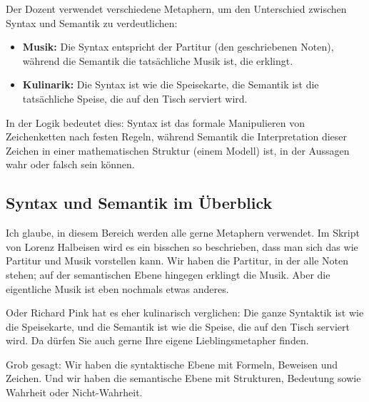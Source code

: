 \begin{didactic-insight}
Der Dozent verwendet verschiedene Metaphern, um den Unterschied zwischen Syntax und Semantik zu verdeutlichen:
\begin{itemize}
    \item \textbf{Musik:} Die Syntax entspricht der Partitur (den geschriebenen Noten), während die Semantik die tatsächliche Musik ist, die erklingt.
    \item \textbf{Kulinarik:} Die Syntax ist wie die Speisekarte, die Semantik ist die tatsächliche Speise, die auf den Tisch serviert wird.
\end{itemize}
In der Logik bedeutet dies: Syntax ist das formale Manipulieren von Zeichenketten nach festen Regeln, während Semantik die Interpretation dieser Zeichen in einer mathematischen Struktur (einem Modell) ist, in der Aussagen wahr oder falsch sein können.
\end{didactic-insight}

\subsection{Syntax und Semantik im Überblick}

\begin{spoken-clean}[00:35:40 - 00:37:30]
Ich glaube, in diesem Bereich werden alle gerne Metaphern verwendet. Im Skript von Lorenz Halbeisen wird es ein bisschen so beschrieben, dass man sich das wie Partitur und Musik vorstellen kann. Wir haben die Partitur, in der alle Noten stehen; auf der semantischen Ebene hingegen erklingt die Musik. Aber die eigentliche Musik ist eben nochmals etwas anderes.

Oder Richard Pink hat es eher kulinarisch verglichen: Die ganze Syntaktik ist wie die Speisekarte, und die Semantik ist wie die Speise, die auf den Tisch serviert wird. Da dürfen Sie auch gerne Ihre eigene Lieblingsmetapher finden.

Grob gesagt: Wir haben die syntaktische Ebene mit Formeln, Beweisen und Zeichen. Und wir haben die semantische Ebene mit Strukturen, Bedeutung sowie Wahrheit oder Nicht-Wahrheit.
\end{spoken-clean}

